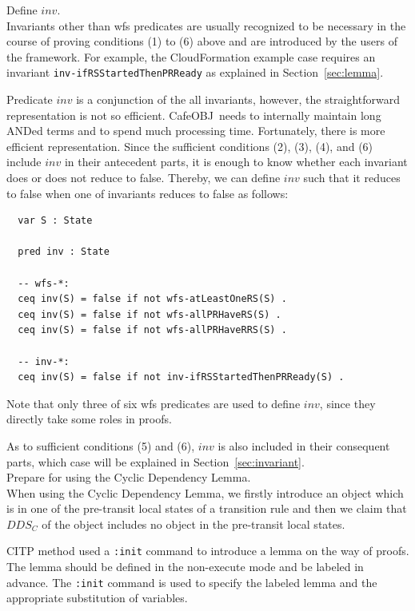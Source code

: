 \documentclass[12pt]{report}
\newcommand{\cafeobj}{{\sf CafeOBJ}~}
\begin{document}
 Define $inv$. \\ Invariants other than wfs
predicates are usually recognized to be necessary in the course of
proving conditions (1) to (6) above and are introduced by the users of
the framework. For example, the CloudFormation example case requires
an invariant {\tt inv-ifRSStartedThenPRReady} as explained in
Section~\ref{sec:lemma}.

Predicate $inv$ is a conjunction of the all invariants, however, the
straightforward representation is not so efficient. \cafeobj needs to
internally maintain long ANDed terms and to spend much processing
time. Fortunately, there is more efficient representation. Since the sufficient
conditions (2), (3), (4), and (6) include $inv$ in their antecedent
parts, it is enough to know whether each invariant does or does not
reduce to false. Thereby, we can define $inv$ such that it reduces to
false when one of invariants reduces to false as follows:
\small
\begin{verbatim}
  var S : State

  pred inv : State

  -- wfs-*:
  ceq inv(S) = false if not wfs-atLeastOneRS(S) .
  ceq inv(S) = false if not wfs-allPRHaveRS(S) .
  ceq inv(S) = false if not wfs-allPRHaveRRS(S) .

  -- inv-*:
  ceq inv(S) = false if not inv-ifRSStartedThenPRReady(S) .
\end{verbatim}
\normalsize
Note that only three of six wfs predicates are used to define $inv$,
since they directly take some roles in proofs.

As to sufficient conditions (5) and (6), $inv$ is also included in
their consequent parts, which case will be explained in
Section~\ref{sec:invariant}.\\

 Prepare for using the Cyclic Dependency
Lemma. \\ When using the Cyclic Dependency Lemma, we firstly introduce
an object which is in one of the pre-transit local states of a
transition rule and then we claim that $\mathit{DDS_C}$ of the object includes
no object in the pre-transit local states.

CITP method used a {\tt :init} command to introduce a lemma on the way
of proofs.  The lemma should be defined in the non-execute mode and be
labeled in advance. The {\tt :init} command is used to specify the labeled lemma and
the appropriate substitution of variables.
\end{document}
